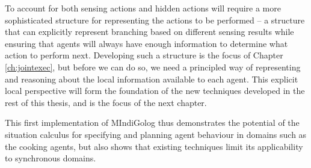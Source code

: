 To account for both sensing actions and hidden actions will require
a more sophisticated structure for representing the actions to be
performed -- a structure that can explicitly represent branching based
on different sensing results while ensuring that agents will always
have enough information to determine what action to perform next.
Developing such a structure is the focus of Chapter \ref{ch:jointexec},
but before we can do so, we need a principled way of representing
and reasoning about the local information available to each agent.
This explicit local perspective will form the foundation of the new
techniques developed in the rest of this thesis, and is the focus
of the next chapter.

This first implementation of MIndiGolog thus demonstrates the potential
of the situation calculus for specifying and planning agent behaviour
in domains such as the cooking agents, but also shows that existing
techniques limit its applicability to synchronous domains.

